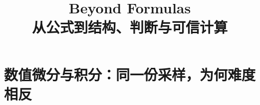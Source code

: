 \documentclass[UTF8,openany]{ctexbook}
\title{Beyond Formulas\\[0.8em]\large 从公式到结构、判断与可信计算}
\author{}
\date{}
\theoremstyle{definition}
\theoremstyle{plain}
\begin{document}
\chapter*{数值微分与积分：同一份采样，为何难度相反}
\label{ch:064}




\end{document}
